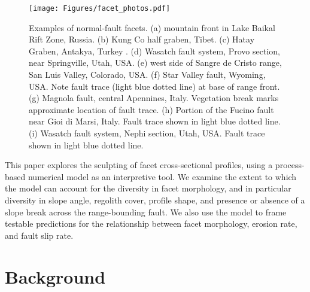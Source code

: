 \begin{figure}[ht!]
\centerline{\texttt{[image: Figures/facet\_photos.pdf]}}
\caption{Examples of normal-fault facets. (a) mountain front in Lake Baikal Rift Zone, Russia. (b) Kung Co half graben, Tibet. (c) Hatay Graben, Antakya, Turkey \citep{boulton2009quantifying}. (d) Wasatch fault system, Provo section, near Springville, Utah, USA. (e) west side of Sangre de Cristo range, San Luis Valley, Colorado, USA. (f) Star Valley fault, Wyoming, USA. Note fault trace (light blue dotted line) at base of range front. (g) Magnola fault, central Apennines, Italy. Vegetation break marks approximate location of fault trace. (h) Portion of the Fucino fault near Gioi di Marsi, Italy. Fault trace shown in light blue dotted line. (i) Wasatch fault system, Nephi section, Utah, USA. Fault trace shown in light blue dotted line.}
\label{fig:facets}
\end{figure}

This paper explores the sculpting of facet cross-sectional profiles, using a process-based numerical model as an interpretive tool. We examine the extent to which the model can account for the diversity in facet morphology, and in particular diversity in slope angle, regolith cover, profile shape, and presence or absence of a slope break across the range-bounding fault. We also use the model to frame testable predictions for the relationship between facet morphology, erosion rate, and fault slip rate.



\section{Background}

